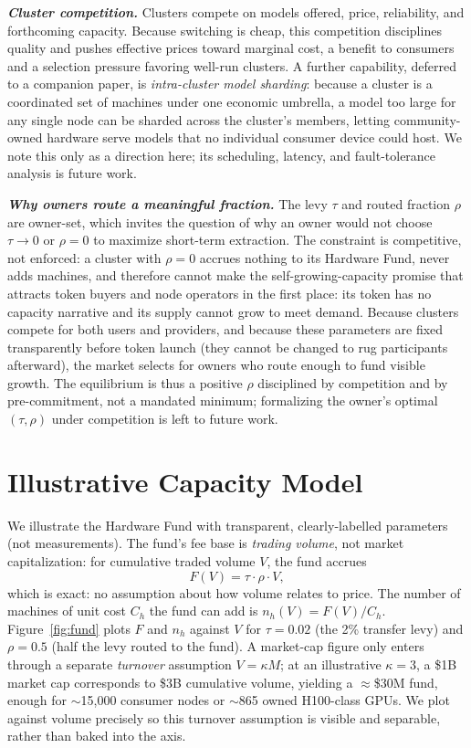 \documentclass[11pt]{article}
\newcommand{\ph}[1]{\textbf{\textit{#1}}}
\begin{document}
\ph{Cluster competition.} Clusters compete on models offered, price, reliability, and forthcoming capacity. Because switching is cheap, this competition disciplines quality and pushes effective prices toward marginal cost, a benefit to consumers and a selection pressure favoring well-run clusters. A further capability, deferred to a companion paper, is \textit{intra-cluster model sharding}: because a cluster is a coordinated set of machines under one economic umbrella, a model too large for any single node can be sharded across the cluster's members, letting community-owned hardware serve models that no individual consumer device could host. We note this only as a direction here; its scheduling, latency, and fault-tolerance analysis is future work.

\ph{Why owners route a meaningful fraction.} The levy $\tau$ and routed fraction $\rho$ are owner-set, which invites the question of why an owner would not choose $\tau\rightarrow 0$ or $\rho=0$ to maximize short-term extraction. The constraint is competitive, not enforced: a cluster with $\rho=0$ accrues nothing to its Hardware Fund, never adds machines, and therefore cannot make the self-growing-capacity promise that attracts token buyers and node operators in the first place: its token has no capacity narrative and its supply cannot grow to meet demand. Because clusters compete for both users and providers, and because these parameters are fixed transparently before token launch (they cannot be changed to rug participants afterward), the market selects for owners who route enough to fund visible growth. The equilibrium is thus a positive $\rho$ disciplined by competition and by pre-commitment, not a mandated minimum; formalizing the owner's optimal $(\tau,\rho)$ under competition is left to future work.

\section{Illustrative Capacity Model}
We illustrate the Hardware Fund with transparent, clearly-labelled parameters (not measurements). The fund's fee base is \textit{trading volume}, not market capitalization: for cumulative traded volume $V$, the fund accrues
\begin{equation}
F(V) = \tau \cdot \rho \cdot V,
\end{equation}
which is exact: no assumption about how volume relates to price. The number of machines of unit cost $C_h$ the fund can add is $n_h(V)=F(V)/C_h$. Figure~\ref{fig:fund} plots $F$ and $n_h$ against $V$ for $\tau=0.02$ (the 2\% transfer levy) and $\rho=0.5$ (half the levy routed to the fund). A market-cap figure only enters through a separate \textit{turnover} assumption $V=\kappa M$; at an illustrative $\kappa=3$, a \$1B market cap corresponds to \$3B cumulative volume, yielding a $\approx$\$30M fund, enough for $\sim$15{,}000 consumer nodes or $\sim$865 owned H100-class GPUs. We plot against volume precisely so this turnover assumption is visible and separable, rather than baked into the axis.
\end{document}

